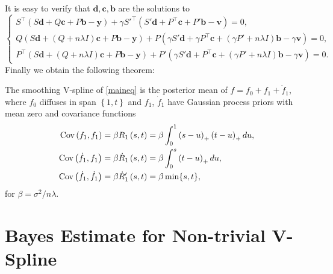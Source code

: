 It is easy to verify that $\mathbf{d},\mathbf{c},\mathbf{b}$ are the solutions to
\begin{equation}
\begin{cases}
S^\top \left(S\mathbf{d} +Q\mathbf{c}+P\mathbf{b}-\mathbf{y}\right) +\gamma S'^\top\left( S'\mathbf{d}+ P^\top \mathbf{c}+ P'\mathbf{b}-\mathbf{v}\right)=0, \\
Q\left(S\mathbf{d}+\left(Q+n\lambda I\right)\mathbf{c}+P\mathbf{b}-\mathbf{y}\right) + P \left( \gamma S' \mathbf{d} + \gamma P^\top \mathbf{c}+ \left(\gamma P'+n\lambda I\right) \mathbf{b}- \gamma \mathbf{v}\right)=0, \\
P^\top \left(S\mathbf{d}+\left(Q+n\lambda I\right) \mathbf{c} +P\mathbf{b}-\mathbf{y}\right)+P'\left(\gamma S'\mathbf{d}+P^\top \mathbf{c}+\left(\gamma P'+n\lambda I\right)\mathbf{b}- \gamma\mathbf{v}\right)=0.
\end{cases}
\end{equation}
Finally we obtain the following theorem: 
\begin{theorem}
The smoothing V-spline of \eqref{maineq} is the posterior
mean of $f=f_0+f_1 + \dot{f}_1$, where $f_0$ diffuses in span $\left\lbrace 1,t\right\rbrace$ and $f_1$, $\dot{f}_1$ have Gaussian process priors with mean zero and covariance functions
\begin{align}
\mathrm{Cov} \left(f_1,f_1\right)   &= \beta R_1\left(s,t\right)   =\beta \int_{0}^{1} \left(s-u\right)_+\left(t-u\right)_+du, \\
\mathrm{Cov} \left(\dot{f}_1,f_1\right)  &= \beta \dot{R}_1\left(s,t\right) =\beta \int_0^s\left(t-u\right)_+du,\\
\mathrm{Cov} \left(\dot{f}_1,\dot{f}_1\right)  &= \beta \dot{R}'_1\left(s,t\right) =\beta \min\lbrace s,t\rbrace,
\end{align}
for $\beta = \sigma^2/n\lambda$.
\end{theorem}



\section{Bayes Estimate for Non-trivial V-Spline}




